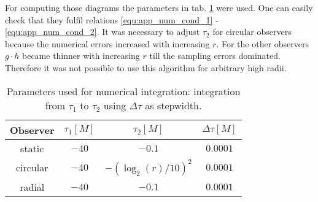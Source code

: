 \begin{refsection}
For computing those diagrams the parameters in tab. \ref{tab:app_num_params} were used. One can easily check that they fulfil relations \eqref{equ:app_num_cond_1} - \eqref{equ:app_num_cond_2}. It was necessary to adjust \(\tau_2\) for circular observers because the numerical errors increased with increasing \(r\). For the other observers \(g\cdot h\) became thinner with increasing \(r\) till the sampling errors dominated. Therefore it was not possible to use this algorithm for arbitrary high radii.
\begin{table}
\centering
\caption[Integration parameters]{Parameters used for numerical integration: integration from \(\tau_1\) to \(\tau_2\) using \(\Delta\tau\) as stepwidth.}
\label{tab:app_num_params}
\begin{tabular}{cccc}
\toprule
Observer & \(\tau_1[M]\) & \(\tau_2[M]\) & \(\Delta\tau[M]\)\\
\midrule
static & \(-40\) & \(-0.1\) &  \(0.0001\)\\
circular & \(-40\) & \(-(\log_2(r)/10)^2\) &  \(0.0001\)\\
radial & \(-40\) & \(-0.1\) &  \(0.0001\)\\
\bottomrule
\end{tabular}
\end{table}

\printbibliography[heading=subbibliography]

\end{refsection}